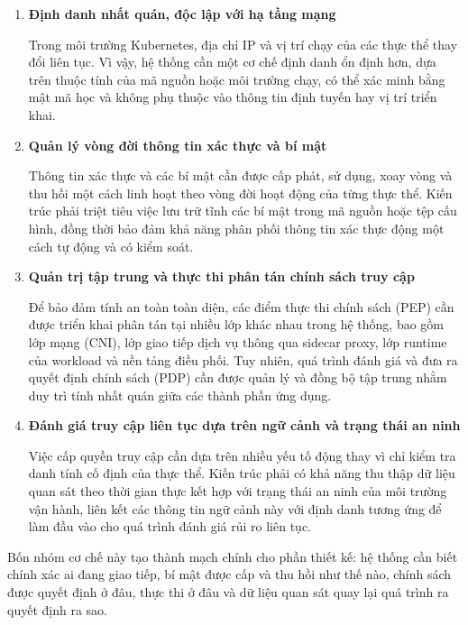 \begin{enumerate}[itemsep=6pt, parsep=0pt]

\item \textbf{Định danh nhất quán, độc lập với hạ tầng mạng}

Trong môi trường Kubernetes, địa chỉ IP và vị trí chạy của các thực thể thay đổi liên tục. Vì vậy, hệ thống cần một cơ chế định danh ổn định hơn, dựa trên thuộc tính của mã nguồn hoặc môi trường chạy, có thể xác minh bằng mật mã học và không phụ thuộc vào thông tin định tuyến hay vị trí triển khai.

\item \textbf{Quản lý vòng đời thông tin xác thực và bí mật}

Thông tin xác thực và các bí mật cần được cấp phát, sử dụng, xoay vòng và thu hồi một cách linh hoạt theo vòng đời hoạt động của từng thực thể. Kiến trúc phải triệt tiêu việc lưu trữ tĩnh các bí mật trong mã nguồn hoặc tệp cấu hình, đồng thời bảo đảm khả năng phân phối thông tin xác thực động một cách tự động và có kiểm soát.

\item \textbf{Quản trị tập trung và thực thi phân tán chính sách truy cập}

Để bảo đảm tính an toàn toàn diện, các điểm thực thi chính sách (PEP) cần được triển khai phân tán tại nhiều lớp khác nhau trong hệ thống, bao gồm lớp mạng (CNI), lớp giao tiếp dịch vụ thông qua sidecar proxy, lớp runtime của workload và nền tảng điều phối. Tuy nhiên, quá trình đánh giá và đưa ra quyết định chính sách (PDP) cần được quản lý và đồng bộ tập trung nhằm duy trì tính nhất quán giữa các thành phần ứng dụng.

\item \textbf{Đánh giá truy cập liên tục dựa trên ngữ cảnh và trạng thái an ninh}

Việc cấp quyền truy cập cần dựa trên nhiều yếu tố động thay vì chỉ kiểm tra danh tính cố định của thực thể. Kiến trúc phải có khả năng thu thập dữ liệu quan sát theo thời gian thực kết hợp với trạng thái an ninh của môi trường vận hành, liên kết các thông tin ngữ cảnh này với định danh tương ứng để làm đầu vào cho quá trình đánh giá rủi ro liên tục.

\end{enumerate}

Bốn nhóm cơ chế này tạo thành mạch chính cho phần thiết kế: hệ thống cần biết chính xác ai đang giao tiếp, bí mật được cấp và thu hồi như thế nào, chính sách được quyết định ở đâu, thực thi ở đâu và dữ liệu quan sát quay lại quá trình ra quyết định ra sao.

